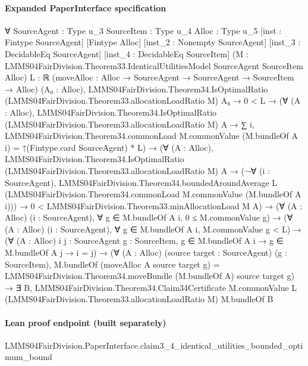 \documentclass[10pt]{article}
\begin{document}
\paragraph{Expanded PaperInterface specification}
\begin{ReviewVerbatim}
∀ {SourceAgent : Type u_3} {SourceItem : Type u_4} {Alloc : Type u_5} [inst : Fintype SourceAgent] [Fintype Alloc]
  [inst_2 : Nonempty SourceAgent] [inst_3 : DecidableEq SourceAgent] [inst_4 : DecidableEq SourceItem]
  (M : LMMS04FairDivision.Theorem33.IdenticalUtilitiesModel SourceAgent SourceItem Alloc) {L : ℝ}
  (moveAlloc : Alloc → SourceAgent → SourceAgent → SourceItem → Alloc) (A₀ : Alloc),
  LMMS04FairDivision.Theorem34.IsOptimalRatio (LMMS04FairDivision.Theorem33.allocationLoadRatio M) A₀ →
    0 < L →
      (∀ (A : Alloc),
          LMMS04FairDivision.Theorem34.IsOptimalRatio (LMMS04FairDivision.Theorem33.allocationLoadRatio M) A →
            ∑ i, LMMS04FairDivision.Theorem34.commonLoad M.commonValue (M.bundleOf A i) =
              ↑(Fintype.card SourceAgent) * L) →
        (∀ (A : Alloc),
            LMMS04FairDivision.Theorem34.IsOptimalRatio (LMMS04FairDivision.Theorem33.allocationLoadRatio M) A →
              (¬∀ (i : SourceAgent),
                    LMMS04FairDivision.Theorem34.boundedAroundAverage L
                      (LMMS04FairDivision.Theorem34.commonLoad M.commonValue (M.bundleOf A i))) →
                0 < LMMS04FairDivision.Theorem33.minAllocationLoad M A) →
          (∀ (A : Alloc) (i : SourceAgent), ∀ g ∈ M.bundleOf A i, 0 ≤ M.commonValue g) →
            (∀ (A : Alloc) (i : SourceAgent), ∀ g ∈ M.bundleOf A i, M.commonValue g < L) →
              (∀ (A : Alloc) {i j : SourceAgent} {g : SourceItem}, g ∈ M.bundleOf A i → g ∈ M.bundleOf A j → i = j) →
                (∀ (A : Alloc) (source target : SourceAgent) (g : SourceItem),
                    M.bundleOf (moveAlloc A source target g) =
                      LMMS04FairDivision.Theorem34.moveBundle (M.bundleOf A) source target g) →
                  ∃ B,
                    LMMS04FairDivision.Theorem34.Claim34Certificate M.commonValue L
                      (LMMS04FairDivision.Theorem33.allocationLoadRatio M) M.bundleOf B
\end{ReviewVerbatim}

\paragraph{Lean proof endpoint (built separately)}\begin{ReviewVerbatim}
LMMS04FairDivision.PaperInterface.claim3_4_identical_utilities_bounded_optimum_bound
\end{ReviewVerbatim}
\end{document}
